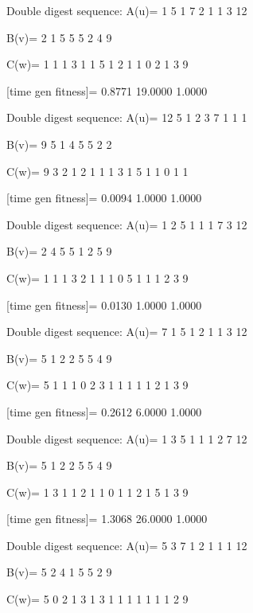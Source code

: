 Double digest sequence:
A(u)=
     1     5     1     7     2     1     1     3    12

B(v)=
     2     1     5     5     5     2     4     9

C(w)=
     1     1     1     3     1     1     5     1     2     1     1     0     2     1     3     9

[time gen fitness]=
    0.8771   19.0000    1.0000

Double digest sequence:
A(u)=
    12     5     1     2     3     7     1     1     1

B(v)=
     9     5     1     4     5     5     2     2

C(w)=
     9     3     2     1     2     1     1     1     3     1     5     1     1     0     1     1

[time gen fitness]=
    0.0094    1.0000    1.0000

Double digest sequence:
A(u)=
     1     2     5     1     1     1     7     3    12

B(v)=
     2     4     5     5     1     2     5     9

C(w)=
     1     1     1     3     2     1     1     1     0     5     1     1     1     2     3     9

[time gen fitness]=
    0.0130    1.0000    1.0000

Double digest sequence:
A(u)=
     7     1     5     1     2     1     1     3    12

B(v)=
     5     1     2     2     5     5     4     9

C(w)=
     5     1     1     1     0     2     3     1     1     1     1     1     2     1     3     9

[time gen fitness]=
    0.2612    6.0000    1.0000

Double digest sequence:
A(u)=
     1     3     5     1     1     1     2     7    12

B(v)=
     5     1     2     2     5     5     4     9

C(w)=
     1     3     1     1     2     1     1     0     1     1     2     1     5     1     3     9

[time gen fitness]=
    1.3068   26.0000    1.0000

Double digest sequence:
A(u)=
     5     3     7     1     2     1     1     1    12

B(v)=
     5     2     4     1     5     5     2     9

C(w)=
     5     0     2     1     3     1     3     1     1     1     1     1     1     1     2     9

